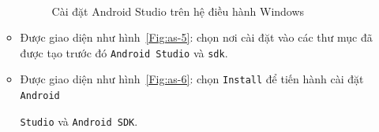 \documentclass[13pt,a4paper]{extreport}
\begin{document}
\begin{itemize}
\begin{itemize}
\begin{figure}[!h]
\begin{center}
							\hspace{.5cm}
							\\
						\end{center}
						\caption{Cài đặt Android Studio trên hệ điều hành Windows}
						\label{Fig:setup-android-studio-window}
						\vspace{-.25cm}
					\end{figure}
					
					\item Được giao diện như hình~\ref{Fig:as-5}: chọn nơi cài đặt vào các thư mục đã được tạo trước đó \verb|Android Studio| và \verb|sdk|.
					
				\item Được giao diện như hình~\ref{Fig:as-6}: chọn \verb|Install| để tiến hành cài đặt \verb|Android| 
				
				\verb|Studio| và \verb|Android SDK|.
				

\end{itemize}
\end{itemize}
\end{document}
